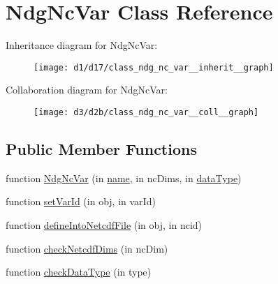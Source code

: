 \hypertarget{class_ndg_nc_var}{}\section{Ndg\+Nc\+Var Class Reference}
\label{class_ndg_nc_var}


Inheritance diagram for Ndg\+Nc\+Var\+:
\nopagebreak
\begin{figure}[H]
\begin{center}
\leavevmode
\texttt{[image: d1/d17/class\_ndg\_nc\_var\_\_inherit\_\_graph]}
\end{center}
\end{figure}


Collaboration diagram for Ndg\+Nc\+Var\+:
\nopagebreak
\begin{figure}[H]
\begin{center}
\leavevmode
\texttt{[image: d3/d2b/class\_ndg\_nc\_var\_\_coll\_\_graph]}
\end{center}
\end{figure}
\subsection*{Public Member Functions}
\begin{DoxyCompactItemize}
\item 
function \hyperlink{class_ndg_nc_var_ac61e6f21d4688dc2de08beb8131dd8c2}{Ndg\+Nc\+Var} (in \hyperlink{class_ndg_nc_var_a102edac9545f8977fa7d7532241b609d}{name}, in nc\+Dims, in \hyperlink{class_ndg_nc_var_ad32db36e532f35fd5b5a535bd2c6ec61}{data\+Type})
\item 
function \hyperlink{class_ndg_nc_var_a37124a0fc96008be773da5b5de8bddb3}{set\+Var\+Id} (in obj, in var\+Id)
\item 
function \hyperlink{class_ndg_nc_var_ae6ee08ebc731c759364aeaccc76c645f}{define\+Into\+Netcdf\+File} (in obj, in ncid)
\item 
function \hyperlink{class_ndg_nc_var_a1bb5d98e86ebadb96d1cbe8294fff377}{check\+Netcdf\+Dims} (in nc\+Dim)
\item 
function \hyperlink{class_ndg_nc_var_af6e383e4e25b4b5538f1144e0a66a97e}{check\+Data\+Type} (in type)
\end{DoxyCompactItemize}
